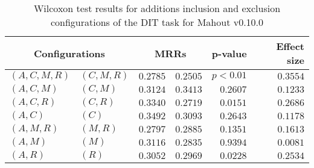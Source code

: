
\begin{table}
\begin{spacing}{1.2}
\centering
\caption{Wilcoxon test results for additions inclusion and exclusion configurations of the DIT task for Mahout v0.10.0}
\label{table:versus-wilcox-mahout-dit-additions}
\begin{tabular}{ll|rr|rr}
\toprule
      \multicolumn{2}{c|}{Configurations} &          \multicolumn{2}{c|}{MRRs} &       p-value & Effect size \\
\midrule
 $(A,C,M,R)$ &  $(C,M,R)$ & $0.2785$ & $0.2505$ & $p<0.01$ &    $0.3554$ \\
   $(A,C,M)$ &    $(C,M)$ & $0.3124$ & $0.3413$ & $0.2607$ &    $0.1233$ \\
   $(A,C,R)$ &    $(C,R)$ & $0.3340$ & $0.2719$ & $0.0151$ &    $0.2686$ \\
     $(A,C)$ &      $(C)$ & $0.3492$ & $0.3093$ & $0.2643$ &    $0.1178$ \\
   $(A,M,R)$ &    $(M,R)$ & $0.2797$ & $0.2885$ & $0.1351$ &    $0.1613$ \\
     $(A,M)$ &      $(M)$ & $0.3116$ & $0.2835$ & $0.9394$ &    $0.0081$ \\
     $(A,R)$ &      $(R)$ & $0.3052$ & $0.2969$ & $0.0228$ &    $0.2534$ \\
\bottomrule
\end{tabular}

\end{spacing}
\end{table}

